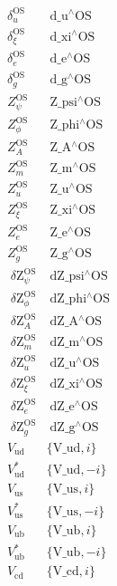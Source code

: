 \documentclass[../FeynCalcManual.tex]{subfiles}
\begin{document}
\begin{dmath*}
\begin{array}{cc}
 \delta _u^{\text{OS}} & \;\text{d$\_$u${}^{\wedge}$OS} \\
 \delta _{\xi }^{\text{OS}} & \;\text{d$\_$xi${}^{\wedge}$OS} \\
 \delta _e^{\text{OS}} & \;\text{d$\_$e${}^{\wedge}$OS} \\
 \delta _g^{\text{OS}} & \;\text{d$\_$g${}^{\wedge}$OS} \\
 Z_{\psi }^{\text{OS}} & \;\text{Z$\_$psi${}^{\wedge}$OS} \\
 Z_{\phi }^{\text{OS}} & \;\text{Z$\_$phi${}^{\wedge}$OS} \\
 Z_A^{\text{OS}} & \;\text{Z$\_$A${}^{\wedge}$OS} \\
 Z_m^{\text{OS}} & \;\text{Z$\_$m${}^{\wedge}$OS} \\
 Z_u^{\text{OS}} & \;\text{Z$\_$u${}^{\wedge}$OS} \\
 Z_{\xi }^{\text{OS}} & \;\text{Z$\_$xi${}^{\wedge}$OS} \\
 Z_e^{\text{OS}} & \;\text{Z$\_$e${}^{\wedge}$OS} \\
 Z_g^{\text{OS}} & \;\text{Z$\_$g${}^{\wedge}$OS} \\
 \;\text{$\delta $Z}_{\psi }^{\text{OS}} & \;\text{dZ$\_$psi${}^{\wedge}$OS} \\
 \;\text{$\delta $Z}_{\phi }^{\text{OS}} & \;\text{dZ$\_$phi${}^{\wedge}$OS} \\
 \;\text{$\delta $Z}_A^{\text{OS}} & \;\text{dZ$\_$A${}^{\wedge}$OS} \\
 \;\text{$\delta $Z}_m^{\text{OS}} & \;\text{dZ$\_$m${}^{\wedge}$OS} \\
 \;\text{$\delta $Z}_u^{\text{OS}} & \;\text{dZ$\_$u${}^{\wedge}$OS} \\
 \;\text{$\delta $Z}_{\xi }^{\text{OS}} & \;\text{dZ$\_$xi${}^{\wedge}$OS} \\
 \;\text{$\delta $Z}_e^{\text{OS}} & \;\text{dZ$\_$e${}^{\wedge}$OS} \\
 \;\text{$\delta $Z}_g^{\text{OS}} & \;\text{dZ$\_$g${}^{\wedge}$OS} \\
 V_{\text{ud}} & \{\text{V$\_$ud},i\} \\
 V_{\text{ud}}^* & \{\text{V$\_$ud},-i\} \\
 V_{\text{us}} & \{\text{V$\_$us},i\} \\
 V_{\text{us}}^* & \{\text{V$\_$us},-i\} \\
 V_{\text{ub}} & \{\text{V$\_$ub},i\} \\
 V_{\text{ub}}^* & \{\text{V$\_$ub},-i\} \\
 V_{\text{cd}} & \{\text{V$\_$cd},i\} \\

\end{array}
\end{dmath*}
\end{document}

